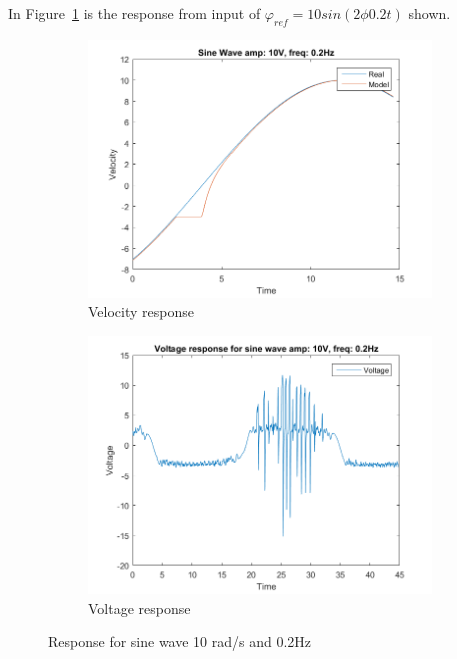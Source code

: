 \documentclass[12pt,a4paper]{article}
\begin{document}
In Figure~\ref{fig:T2_a10_f02:a} is the response from input of
$\varphi_{ref}=10sin(2\phi 0.2t)$ shown.
\begin{figure}[H]
  \centering
  \begin{subfigure}[b]{0.45\linewidth}
    \includegraphics[width=\linewidth]{T2_a10_f02.png}
    \caption{Velocity response }
    \label{fig:T2_a10_f02:a}
  \end{subfigure}
  \begin{subfigure}[b]{0.45\linewidth}
    \includegraphics[width=\linewidth]{T2_V_a10_f02.png}
    \caption{Voltage response }
    \label{fig:T2_a10_f02:b}
  \end{subfigure}
  \caption{Response for sine wave 10 rad/s and 0.2Hz}
  \label{fig:T2_a10_f02}
\end{figure}
\end{document}
